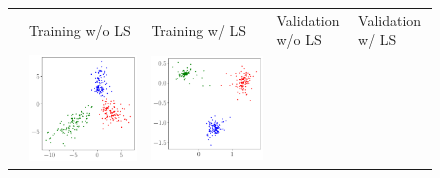 \begin{figure}[ht]
\centering
        {\setlength{\tabcolsep}{0em}\begin{tabular}{m{.03\linewidth}*4{C}@{}}
        
             & Training w/o LS & Training w/ LS & Validation w/o LS & Validation w/ LS \\ 
            & \includegraphics[width=\linewidth]{figures/alexnet_penultimate_plot_1.pdf} 
            & \includegraphics[width=\linewidth]{figures/alexnet_penultimate_plot_3.pdf} 

\end{tabular}}
\end{figure}
